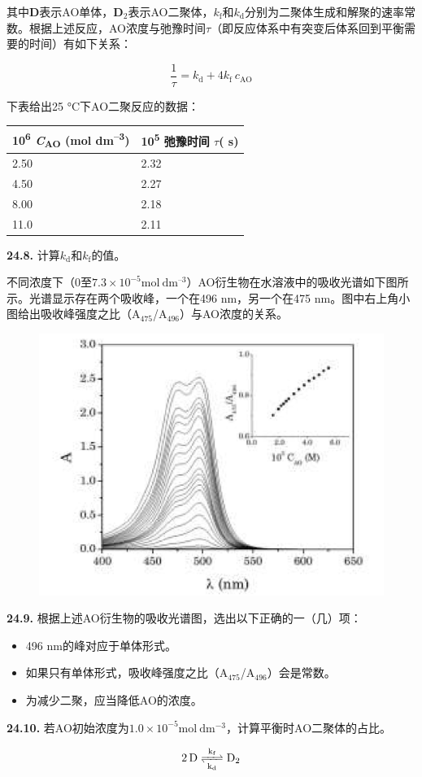 \noindent 其中\textbf{D}表示AO单体，\textbf{D}\(_2\)表示AO二聚体，$k_\mathrm{f}$和$k_\mathrm{d}$分别为二聚体生成和解聚的速率常数。根据上述反应，AO浓度与弛豫时间$\tau$（即反应体系中有突变后体系回到平衡需要的时间）有如下关系：

\[\frac{1}{\tau} = k_\mathrm{d} + 4k_\mathrm{f}\ c_\mathrm{AO}\]

\noindent 下表给出25 °C下AO二聚反应的数据：

\begin{longtable}[]{@{}ll@{}}
    \toprule
    10\textsuperscript{6} \emph{C}\textsubscript{AO} (mol
    dm\textsuperscript{--3}) & 10\textsuperscript{5} 弛豫时间 \emph{$\tau$}(
    s)\tabularnewline
    \midrule
    \endhead
    2.50 & 2.32\tabularnewline
    4.50 & 2.27\tabularnewline
    8.00 & 2.18\tabularnewline
    11.0 & 2.11\tabularnewline
    \bottomrule
\end{longtable}

\noindent\textbf{24.8.}
计算$k_\mathrm{d}$和$k_\mathrm{f}$的值。

不同浓度下（\(0\)至$\mathrm{7.3 \times 10^{-5} mol\ dm^{–3}}$）AO衍生物在水溶液中的吸收光谱如下图所示。光谱显示存在两个吸收峰，一个在496 nm，另一个在475 nm。图中右上角小图给出吸收峰强度之比（A\(_{475}\)/A\(_{496}\)）与AO浓度的关系。

\begin{figure}[h]
	\centering
	\includegraphics[width=14cm]{./pic/t24-2.png}
\end{figure}

\noindent\textbf{24.9.}
根据上述AO衍生物的吸收光谱图，选出以下正确的一（几）项：
\renewcommand{\labelitemi}{$\square$}
\begin{itemize}
    \item 496 nm的峰对应于单体形式。
    \item 如果只有单体形式，吸收峰强度之比（A\(_{475}\)/A\(_{496}\)）会是常数。
    \item 为减少二聚，应当降低AO的浓度。
\end{itemize}
\renewcommand{\labelitemi}{$\bullet$}

\noindent\textbf{24.10.}
若AO初始浓度为$\mathrm{1.0 \times 10^{-5} mol\ dm^{-3}}$，计算平衡时AO二聚体的占比。

\[\ce{2D <=>[{k_\mathrm{f}}][{k_\mathrm{d}}] D_2 }\]
